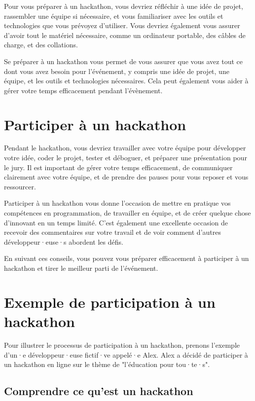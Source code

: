 Pour vous préparer à un hackathon, vous devriez réfléchir à une idée de projet, rassembler une équipe si nécessaire, et vous familiariser avec les outils et technologies que vous prévoyez d'utiliser. Vous devriez également vous assurer d'avoir tout le matériel nécessaire, comme un ordinateur portable, des câbles de charge, et des collations.

Se préparer à un hackathon vous permet de vous assurer que vous avez tout ce dont vous avez besoin pour l'événement, y compris une idée de projet, une équipe, et les outils et technologies nécessaires. Cela peut également vous aider à gérer votre temps efficacement pendant l'évènement.

\section{Participer à un hackathon}

Pendant le hackathon, vous devriez travailler avec votre équipe pour développer votre idée, coder le projet, tester et déboguer, et préparer une présentation pour le jury. Il est important de gérer votre temps efficacement, de communiquer clairement avec votre équipe, et de prendre des pauses pour vous reposer et vous ressourcer.

Participer à un hackathon vous donne l'occasion de mettre en pratique vos compétences en programmation, de travailler en équipe, et de créer quelque chose d'innovant en un temps limité. C'est également une excellente occasion de recevoir des commentaires sur votre travail et de voir comment d'autres développeur·euse·s abordent les défis.

En suivant ces conseils, vous pouvez vous préparer efficacement à participer à un hackathon et tirer le meilleur parti de l'événement.

\section{Exemple de participation à un hackathon}

Pour illustrer le processus de participation à un hackathon, prenons l'exemple d'un·e développeur·euse fictif·ve appelé·e Alex. Alex a décidé de participer à un hackathon en ligne sur le thème de "l'éducation pour tou·te·s".

\subsection{Comprendre ce qu'est un hackathon}

